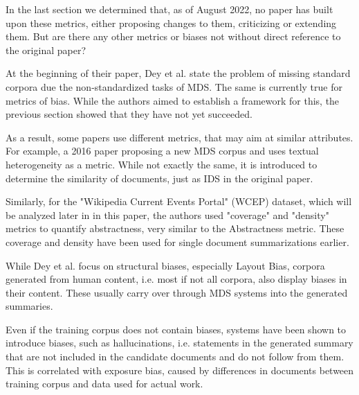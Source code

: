 \documentclass[../main.tex]{subfiles}
\begin{document}
In the last section we determined that, as of August 2022, no paper has built upon these metrics, either proposing changes to them, criticizing or extending them.
But are there any other metrics or biases not without direct reference to the original paper?

At the beginning of their paper, Dey et al. state the problem of missing standard corpora due the non-standardized tasks of MDS.
The same is currently true for metrics of bias.
While the authors aimed to establish a framework for this, the previous section showed that they have not yet succeeded.

As a result, some papers use different metrics, that may aim at similar attributes. For example, a 2016 paper proposing a new MDS corpus and uses textual heterogeneity as a metric. \cite{zopf_maxime_peyrard_eckle-kohler_2016}
While not exactly the same, it is introduced to determine the similarity of documents, just as IDS in the original paper.

Similarly, for the "Wikipedia Current Events Portal" (WCEP) dataset,
which will be analyzed later in in this paper, the authors used "coverage" and "density" metrics to quantify abstractness,
very similar to the Abstractness metric.\cite{WCEP-gholipour-ghalandari-etal-2020-large}
These coverage and density have been used for single document summarizations earlier.\cite{grusky-etal-2018-newsroom}


While Dey et al. focus on structural biases, especially Layout Bias, corpora generated from human content, i.e. most if not all corpora, also display biases in their content. These usually carry over through MDS systems into the generated summaries. \cite{nadeem-etal-2021-stereoset}

Even if the training corpus does not contain biases, systems have been shown to introduce biases, such as hallucinations, i.e. statements in the generated summary that are not included in the candidate documents and do not follow from them. This is correlated with exposure bias, caused by differences in documents between training corpus and data used for actual work. \cite{Exposure_bias_wang_sennrich_2020}



\end{document}
